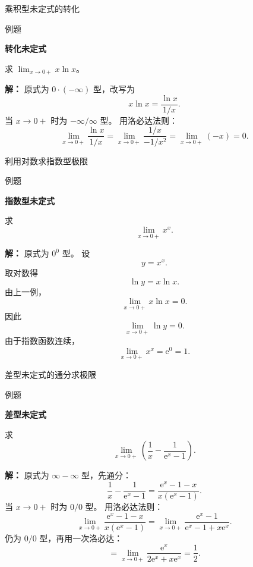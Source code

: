 \documentclass[aspectratio=169,10pt,fontset=fandol]{ctexbeamer}
\newcommand{\ee}{\mathrm{e}}
\begin{document}
\begin{frame}[t,fragile]{乘积型未定式的转化}
\normalsize
\begin{block}{例题}
{\normalsize
\textbf{转化未定式}\par

求 $\displaystyle\lim_{x\to0+}x\ln x$。

}
\end{block}
\pause
{\normalsize
\textbf{解：}
原式为 $0\cdot(-\infty)$ 型，改写为
\[
x\ln x=\frac{\ln x}{1/x}.
\]
当 $x\to0+$ 时为 $-\infty/\infty$ 型。 用洛必达法则：
\[
\lim_{x\to0+}\frac{\ln x}{1/x}
=\lim_{x\to0+}\frac{1/x}{-1/x^2}
=\lim_{x\to0+}(-x)=0.
\]

}
\end{frame}
\begin{frame}[t,fragile]{利用对数求指数型极限}
\footnotesize
\begin{block}{例题}
{\footnotesize
\textbf{指数型未定式}\par

求
\[
\lim_{x\to0+}x^x.
\]

}
\end{block}
\pause
{\footnotesize
\textbf{解：}
原式为 $0^0$ 型。 设
\[
y=x^x.
\]
取对数得
\[
\ln y=x\ln x.
\]
由上一例，
\[
\lim_{x\to0+}x\ln x=0.
\]
因此
\[
\lim_{x\to0+}\ln y=0.
\]
由于指数函数连续，
\[
\lim_{x\to0+}x^x=\ee^0=1.
\]

}
\end{frame}
\begin{frame}[t,fragile]{差型未定式的通分求极限}
\small
\begin{block}{例题}
{\small
\textbf{差型未定式}\par

求
\[
\lim_{x\to0+}\left(\frac1x-\frac1{\ee^x-1}\right).
\]

}
\end{block}
\pause
{\small
\textbf{解：}
原式为 $\infty-\infty$ 型，先通分：
\[
\frac1x-\frac1{\ee^x-1}
=\frac{\ee^x-1-x}{x(\ee^x-1)}.
\]
当 $x\to0+$ 时为 $0/0$ 型。 用洛必达法则：
\[
\lim_{x\to0+}\frac{\ee^x-1-x}{x(\ee^x-1)}
=\lim_{x\to0+}\frac{\ee^x-1}{\ee^x-1+x\ee^x}.
\]
仍为 $0/0$ 型，再用一次洛必达：
\[
=\lim_{x\to0+}\frac{\ee^x}{2\ee^x+x\ee^x}
=\frac12.
\]

}
\end{frame}
\end{document}
